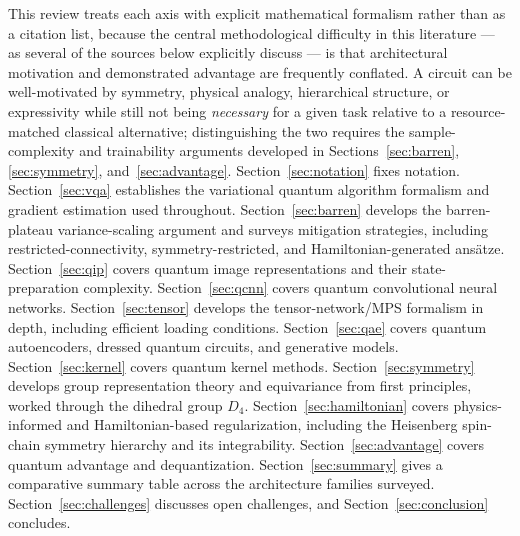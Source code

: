 \documentclass[11pt]{article}
\begin{document}
This review treats each axis with explicit mathematical formalism rather than as a citation list, because the central methodological difficulty in this literature — as several of the sources below explicitly discuss \cite{Huang2021PowerData,Cotler2021,Gyurik2023} — is that architectural motivation and demonstrated advantage are frequently conflated. A circuit can be well-motivated by symmetry, physical analogy, hierarchical structure, or expressivity while still not being \emph{necessary} for a given task relative to a resource-matched classical alternative; distinguishing the two requires the sample-complexity and trainability arguments developed in Sections~\ref{sec:barren}, \ref{sec:symmetry}, and~\ref{sec:advantage}. Section~\ref{sec:notation} fixes notation. Section~\ref{sec:vqa} establishes the variational quantum algorithm formalism and gradient estimation used throughout. Section~\ref{sec:barren} develops the barren-plateau variance-scaling argument and surveys mitigation strategies, including restricted-connectivity, symmetry-restricted, and Hamiltonian-generated ansätze. Section~\ref{sec:qip} covers quantum image representations and their state-preparation complexity. Section~\ref{sec:qcnn} covers quantum convolutional neural networks. Section~\ref{sec:tensor} develops the tensor-network/MPS formalism in depth, including efficient loading conditions. Section~\ref{sec:qae} covers quantum autoencoders, dressed quantum circuits, and generative models. Section~\ref{sec:kernel} covers quantum kernel methods. Section~\ref{sec:symmetry} develops group representation theory and equivariance from first principles, worked through the dihedral group $D_4$. Section~\ref{sec:hamiltonian} covers physics-informed and Hamiltonian-based regularization, including the Heisenberg spin-chain symmetry hierarchy and its integrability. Section~\ref{sec:advantage} covers quantum advantage and dequantization. Section~\ref{sec:summary} gives a comparative summary table across the architecture families surveyed. Section~\ref{sec:challenges} discusses open challenges, and Section~\ref{sec:conclusion} concludes.
\end{document}

